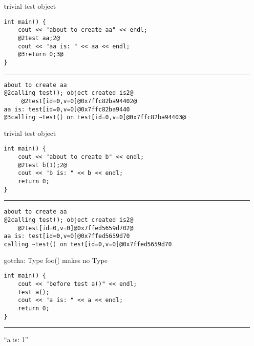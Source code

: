 \begin{frame}[fragile,label=testtrivial]{trivial test object}
\begin{lstlisting}
int main() {
    cout << "about to create aa" << endl;
    @2test aa;2@
    cout << "aa is: " << aa << endl;
    @3return 0;3@
}
\end{lstlisting}
\hrule
\begin{lstlisting}
about to create aa
@2calling test(); object created is2@
     @2test[id=0,v=0]@0x7ffc82ba94402@
aa is: test[id=0,v=0]@0x7ffc82ba9440
@3calling ~test() on test[id=0,v=0]@0x7ffc82ba94403@
\end{lstlisting}
\end{frame}

\begin{frame}[fragile,label=usingTest2]{trivial test object}
\begin{lstlisting}
int main() {
    cout << "about to create b" << endl;
    @2test b(1);2@
    cout << "b is: " << b << endl;
    return 0;
}
\end{lstlisting}
\hrule
\begin{lstlisting}
about to create aa
@2calling test(); object created is2@
    @2test[id=0,v=0]@0x7ffed5659d702@
aa is: test[id=0,v=0]@0x7ffed5659d70
calling ~test() on test[id=0,v=0]@0x7ffed5659d70
\end{lstlisting}
\end{frame}

\begin{frame}[fragile,label=gotcha]{gotcha: Type foo() makes no Type}
\begin{lstlisting}
int main() {
    cout << "before test a()" << endl;
    test a();
    cout << "a is: " << a << endl;
    return 0;
}
\end{lstlisting}
\hrule
``a is: 1''
\end{frame}

